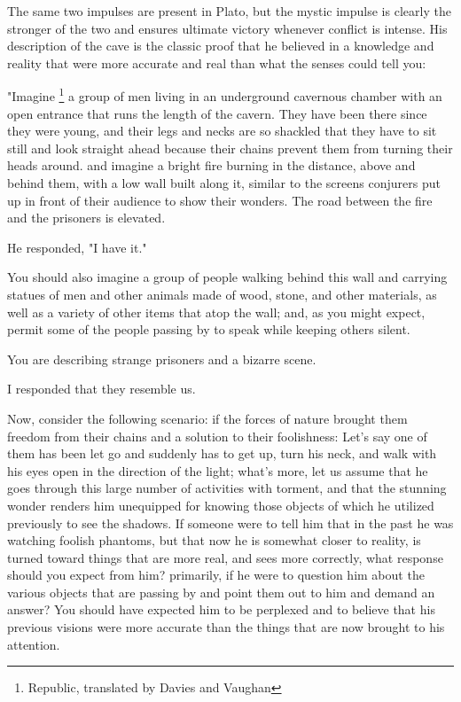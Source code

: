 \documentclass[a4paper,12pt]{book}[2004/02/16]
\theoremstyle{ilemma}
\theoremstyle{itheorem}
\theoremstyle{iother}
\theoremstyle{icorollary}
\theoremstyle{numcorollary}
\theoremstyle{idefinition}
\begin{document}
The same two impulses are present in Plato, but the mystic impulse is clearly the stronger of the two and ensures ultimate victory whenever conflict is intense. His description of the cave is the classic proof that he believed in a knowledge and reality that were more accurate and real than what the senses could tell you:

  "Imagine \footnote{Republic, translated by Davies and Vaughan} a group of men living in an underground cavernous chamber with an open entrance that runs the length of the cavern. They have been there since they were young, and their legs and necks are so shackled that they have to sit still and look straight ahead because their chains prevent them from turning their heads around. and imagine a bright fire burning in the distance, above and behind them, with a low wall built along it, similar to the screens conjurers put up in front of their audience to show their wonders. The road between the fire and the prisoners is elevated.

  He responded, "I have it."

  You should also imagine a group of people walking behind this wall and carrying statues of men and other animals made of wood, stone, and other materials, as well as a variety of other items that atop the wall; and, as you might expect, permit some of the people passing by to speak while keeping others silent.

  You are describing strange prisoners and a bizarre scene.

  I responded that they resemble us.

  Now, consider the following scenario: if the forces of nature brought them freedom from their chains and a solution to their foolishness: Let's say one of them has been let go and suddenly has to get up, turn his neck, and walk with his eyes open in the direction of the light; what's more, let us assume
  that he goes through this large number of activities with torment, and that the
  stunning wonder renders him unequipped for knowing those
  objects of which he utilized previously to see the shadows. If someone were to tell him that in the past he was watching foolish phantoms, but that now he is somewhat closer to reality, is turned toward things that are more real, and sees more correctly, what response should you expect from him? primarily, if he were to question him about the various objects that are passing by and point them out to him and demand an answer? You should have expected him to be perplexed and to believe that his previous visions were more accurate than the things that are now brought to his attention.
\end{document}
